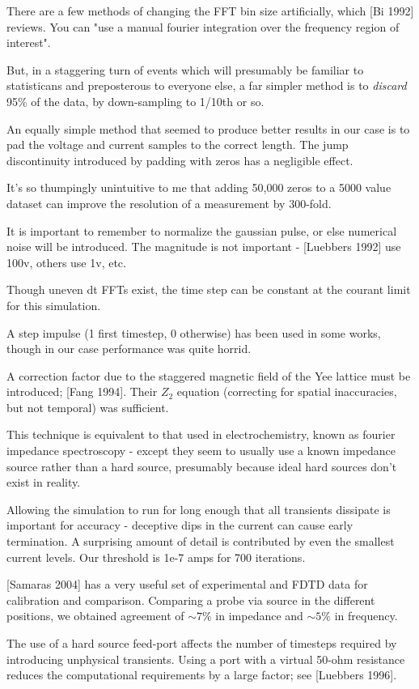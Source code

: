 \documentclass[paper.tex]{subfiles}
\begin{document}
There are a few methods of changing the FFT bin size artificially, which [Bi 1992] reviews. You can "use a manual fourier integration over the frequency region of interest".

But, in a staggering turn of events which will presumably be familiar to statisticans and preposterous to everyone else, a far simpler method is to {\it discard} 95\% of the data, by down-sampling to 1/10th or so.

An equally simple method that seemed to produce better results in our case is to pad the voltage and current samples to the correct length. The jump discontinuity introduced by padding with zeros has a negligible effect.

It's so thumpingly unintuitive to me that adding 50,000 zeros to a 5000 value dataset can improve the resolution of a measurement by 300-fold.

It is important to remember to normalize the gaussian pulse, or else numerical noise will be introduced. The magnitude is not important - [Luebbers 1992] use 100v, others use 1v, etc.

Though uneven dt FFTs exist, the time step can be constant at the courant limit for this simulation.

A step impulse (1 first timestep, 0 otherwise) has been used in some works, though in our case performance was quite horrid.

A correction factor due to the staggered magnetic field of the Yee lattice must be introduced; [Fang 1994]. Their $Z_2$ equation (correcting for spatial inaccuracies, but not temporal) was sufficient.


This technique is equivalent to that used in electrochemistry, known as fourier impedance spectroscopy - except they seem to usually use a known impedance source rather than a hard source, presumably because ideal hard sources don't exist in reality.

Allowing the simulation to run for long enough that all transients dissipate is important for accuracy - deceptive dips in the current can cause early termination. A surprising amount of detail is contributed by even the smallest current levels. Our threshold is 1e-7 amps for 700 iterations.

[Samaras 2004] has a very useful set of experimental and FDTD data for calibration and comparison. Comparing a probe via source in the different positions, we obtained agreement of $\sim 7\%$ in impedance and $\sim 5\%$ in frequency.

The use of a hard source feed-port affects the number of timesteps required by introducing unphysical transients. Using a port with a virtual 50-ohm resistance reduces the computational requirements by a large factor; see [Luebbers 1996].
\end{document}
